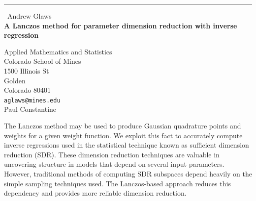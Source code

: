 \documentclass{report}
\begin{document}
\begin{center}
\rule{6in}{1pt} \
{\large Andrew Glaws \\
{\bf A Lanczos method for parameter dimension reduction with inverse regression}}

Applied Mathematics and Statistics \\ Colorado School of Mines \\ 1500 Illinois St \\ Golden \\ Colorado 80401
\\
{\tt aglaws@mines.edu}\\
Paul Constantine\end{center}

The Lanczos method may be used to produce Gaussian quadrature points and
weights for a given weight function. We exploit this fact to accurately
compute inverse regressions used in the statistical technique known as
sufficient dimension reduction (SDR). These dimension reduction
techniques are valuable in uncovering structure in models that depend on
several input parameters. However, traditional methods of computing SDR
subspaces depend heavily on the simple sampling techniques used. The
Lanczos-based approach reduces this dependency and provides more reliable
dimension reduction.
\end{document}
